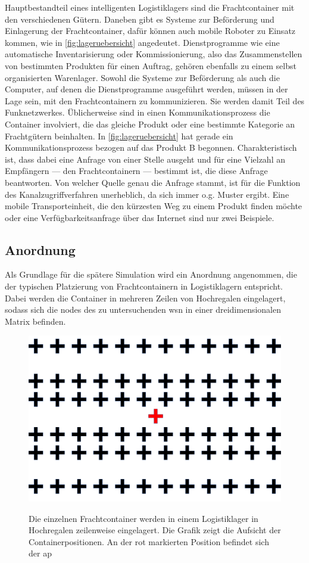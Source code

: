 Hauptbestandteil eines intelligenten Logistiklagers sind die Frachtcontainer mit den verschiedenen Gütern. Daneben gibt es Systeme zur Beförderung und Einlagerung der Frachtcontainer, dafür können auch mobile Roboter zu Einsatz kommen, wie in \autoref{fig:lageruebersicht} angedeutet. Dienstprogramme wie eine automatische Inventarisierung oder Kommissionierung, also das Zusammenstellen von bestimmten Produkten für einen Auftrag, gehören ebenfalls zu  einem selbst organisierten Warenlager. Sowohl die Systeme zur Beförderung als auch die Computer, auf denen die Dienstprogramme ausgeführt werden, müssen in der Lage sein, mit den Frachtcontainern zu kommunizieren. Sie werden damit Teil des Funknetzwerkes. Üblicherweise sind in einen Kommunikationsprozess die Container involviert, die das gleiche Produkt oder eine bestimmte Kategorie an Frachtgütern beinhalten. In \autoref{fig:lageruebersicht} hat \zB gerade ein Kommunikationsprozess bezogen auf das Produkt B begonnen. Charakteristisch ist, dass dabei eine Anfrage von einer Stelle ausgeht und für eine Vielzahl an Empfängern --- den Frachtcontainern --- bestimmt ist, die diese Anfrage beantworten. Von welcher Quelle genau die Anfrage stammt, ist für die Funktion des Kanalzugriffverfahren unerheblich, da sich immer o.g. Muster ergibt. Eine mobile Transporteinheit, die den kürzesten Weg zu einem Produkt finden möchte oder eine Verfügbarkeitsanfrage über das Internet sind nur zwei Beispiele.

\subsection{Anordnung}
Als Grundlage für die spätere Simulation wird ein Anordnung angenommen, die der typischen Platzierung von Frachtcontainern in Logistiklagern entspricht. Dabei werden die Container in mehreren Zeilen von Hochregalen eingelagert, sodass sich die \glspl{node} des zu untersuchenden \ac{wsn} in einer dreidimensionalen Matrix befinden. 

\begin{figure}[bth]
        \myfloatalign
        {\includegraphics[width=0.4\linewidth]{gfx/anordnung}} 
        \caption[Anordnung von Frachtcontainern in einem Logistiklager]{Die einzelnen Frachtcontainer werden in einem Logistiklager in Hochregalen zeilenweise eingelagert. Die Grafik zeigt die Aufsicht der Containerpositionen. An der rot markierten Position befindet sich der \acs{ap}}\label{fig:lager}
\end{figure}

